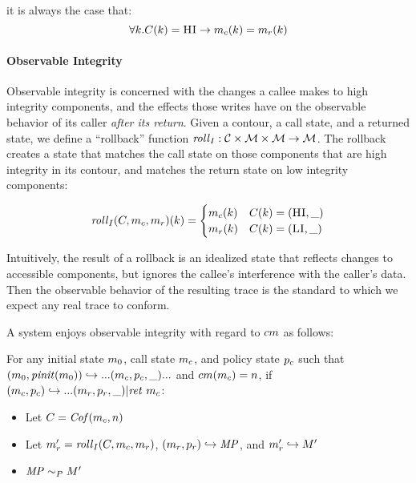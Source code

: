 \documentclass[conference]{IEEEtran}
\begin{document}
      it is always the case that:
      \[\forall k . C(k) = \textsc{HI} \rightarrow m_c(k) = m_r(k)\]

    \paragraph{Observable Integrity}

      Observable integrity is concerned with the changes a callee makes to high integrity components,
      and the effects those writes have on the observable behavior of its caller
      {\it after its return}. Given a contour, a call state, and a returned state, we define
      a ``rollback'' function \(\mathit{roll}_I : {\mathcal C} \times {\mathcal M} \times {\mathcal M}
      \rightarrow {\mathcal M}\). The rollback creates a state that matches the call
      state on those components that are high integrity in its contour, and matches the return state
      on low integrity components:

      \[\mathit{roll}_I(C,m_c,m_r)(k) =
      \begin{cases}
        m_c(k) & C(k) = (\textsc{HI},\_) \\
        m_r(k) & C(k) = (\textsc{LI},\_) \\
      \end{cases}\]

      Intuitively, the result of a rollback is an idealized state that reflects changes to accessible
      components, but ignores the callee's interference with the caller's data. Then the observable
      behavior of the resulting trace is the standard to which we expect any real trace to conform.

      A system enjoys observable integrity with regard to \(cm\) as follows:

      For any initial state \(m_0\), call state \(m_c\), and policy state \(p_c\) such that
      \((m_0,\mathit{pinit}(m_0)) \hookrightarrow ... (m_c,p_c,\_) ...\)
      and \(cm(m_c) = n\), if \((m_c,p_c) \hookrightarrow ...
        (m_r,p_r,\_) | \mathit{ret}\ m_c\):

          \begin{itemize}
            \item Let \(C = \mathit{Cof}(m_c,n)\)
            \item Let \(m_r' = \mathit{roll}_I(C,m_c,m_r)\), \((m_r,p_r)
              \hookrightarrow \mathit{MP}\), and \(m_r' \hookrightarrow M'\)
            \item \(\mathit{MP} \sim_P M'\)
          \end{itemize}
    
\end{document}
